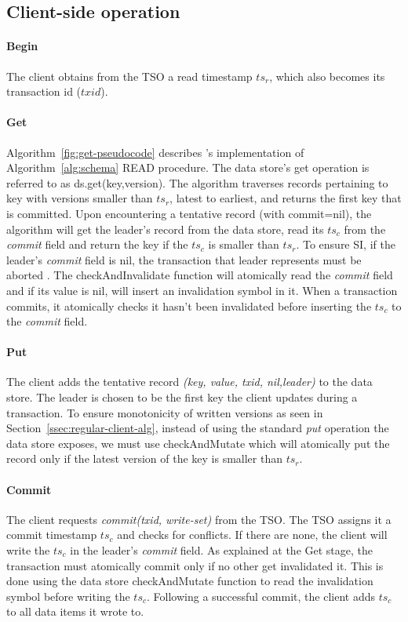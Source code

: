 \subsection{Client-side operation}
\label{ssec:client}

\paragraph{Begin}
The client obtains from the TSO a read timestamp $ts_r$, which also becomes its transaction id ($txid$).


\paragraph{Get}
Algorithm~\ref{fig:get-pseudocode} describes \sys's implementation of Algorithm~\ref{alg:schema} READ procedure.
The data store's get operation is referred to as ds.get(key,version). The algorithm traverses records pertaining
to key with versions smaller than $ts_r$, latest to earliest, and returns the first key that is committed. Upon
encountering a tentative record (with commit=nil), the algorithm will get the leader's record from the data store,
read its $ts_c$ from the \emph{commit} field and return the key if the $ts_c$ is smaller than $ts_r$. To ensure SI,
if the leader's \emph{commit} field is nil, the transaction that leader represents must be aborted . The checkAndInvalidate function will atomically read the \emph{commit} field and if its value is nil, will insert an invalidation symbol in it. When a transaction commits, it atomically checks it hasn't been invalidated before inserting the $ts_c$ to the \emph{commit} field.

\paragraph{Put}
The client adds the tentative record \emph{(key, value, txid, nil,leader)} to the data store.
The leader is chosen to be the first key the client updates during a transaction.
To ensure monotonicity of written versions as seen in Section~\ref{ssec:regular-client-alg}, instead of using the standard \emph{put} operation the data store exposes, we must use checkAndMutate which will atomically put the record only if the latest version of the key is smaller than $ts_r$.


\paragraph{Commit}
The client requests \emph{commit(txid, write-set)} from the TSO. The TSO assigns it a commit timestamp $ts_c$ and checks for conflicts. If there are none, the client will write the $ts_c$ in the leader's \emph{commit} field. As explained at the Get stage, the transaction must atomically commit only if no other get invalidated it. This is done using the data store checkAndMutate function to read the invalidation symbol before writing the $ts_c$.
Following a successful commit, the client adds $ts_c$ to all data items it wrote to.

